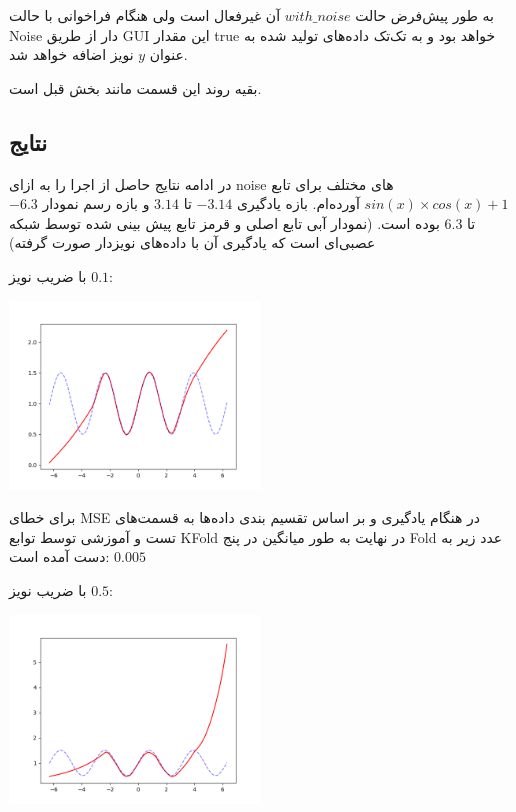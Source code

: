\documentclass[12pt,titlepage,a4page , tikz , multi,table , svgnames,xcdraw]{article}
\begin{document}
به طور پیش‌فرض حالت $with\_noise$ آن غیرفعال است ولی هنگام فراخوانی با حالت Noise دار از طریق GUI این مقدار true خواهد بود و به تک‌تک داده‌های تولید شده به عنوان $y$ نویز اضافه خواهد شد.

بقیه روند این قسمت مانند بخش قبل است.


\newpage
\subsection{نتایج}

در ادامه نتایج حاصل از اجرا را به ازای noise های مختلف برای تابع $sin(x) \times cos(x) + 1$ آورده‌ام. بازه یادگیری $-3.14$ تا $3.14$ و بازه رسم نمودار $-6.3$ تا $6.3$ بوده است. (نمودار آبی تابع اصلی و قرمز تابع پیش بینی شده توسط شبکه عصبی‌ای است که یادگیری آن با داده‌های نویزدار صورت گرفته)


با ضریب نویز $0.1$: 
\begin{center}

 \includegraphics[width=0.5\textwidth]{pictures/6.png}

\end{center}

برای خطای MSE در هنگام یادگیری و بر اساس تقسیم بندی داده‌ها به قسمت‌های تست و آموزشی توسط توابع KFold در نهایت به طور میانگین در پنج Fold عدد زیر به دست آمده است:
$ 0.005$



\hrulefill


با ضریب نویز $0.5$: 
\begin{center}

 \includegraphics[width=0.5\textwidth]{pictures/7.png}

\end{center}
\end{document}
